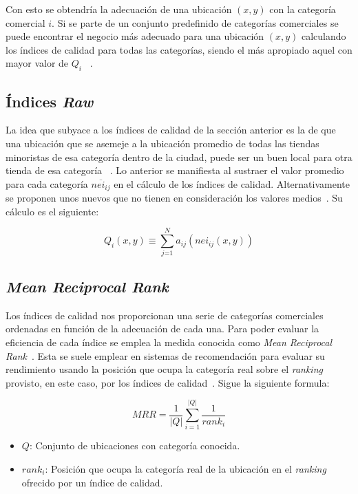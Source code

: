 Con esto se obtendría la adecuación de una ubicación $(x,y)$ con la categoría comercial $i$. Si se parte de un conjunto predefinido de categorías comerciales se puede encontrar el negocio más adecuado para una ubicación $(x,y)$ calculando los índices de calidad para todas las categorías, siendo el más apropiado aquel con mayor valor de $Q_i$ ~\cite{Ahedo2021,Jensen2006}.

\subsection{Índices \textit{Raw}}

La idea que subyace a los índices de calidad de la sección anterior es la de que una ubicación que se asemeje a la ubicación promedio de todas las tiendas minoristas de esa categoría dentro de la ciudad, puede ser un buen local para otra tienda de esa categoría ~\cite{Jensen2006}. Lo anterior se manifiesta al sustraer el valor promedio para cada categoría $\overline{nei_{ij}}$ en el cálculo de los índices de calidad. Alternativamente se proponen unos nuevos que no tienen en consideración los valores medios~\cite{Ahedo2021}. Su cálculo es el siguiente:

\begin{equation*}
	Q_i(x,y) \equiv \sum_\textit{j=1}^N a_{ij}  (nei_{ij}(x,y))
\end{equation*}

\subsection{\textit{Mean Reciprocal Rank}}

Los índices de calidad nos proporcionan una serie de categorías comerciales ordenadas en función de la adecuación de cada una. Para poder evaluar la eficiencia de cada índice se emplea la medida conocida como \textit{Mean Reciprocal Rank}~\cite{MRR}. Esta se suele emplear en sistemas de recomendación para evaluar su rendimiento usando la posición que ocupa la categoría real sobre el \textit{ranking} provisto, en este caso, por los índices de calidad~\cite{Ahedo2021}. Sigue la siguiente formula:

\begin{equation*}
	MRR = \frac{1}{|Q|}  \sum_{i=1}^{|Q|} \frac{1}{rank_i}
\end{equation*}

\begin{itemize}
	\item $Q$: Conjunto de ubicaciones con categoría conocida.
	\item $rank_i$: Posición que ocupa la categoría real de la ubicación en el \textit{ranking} ofrecido por un índice de calidad.
\end{itemize}


